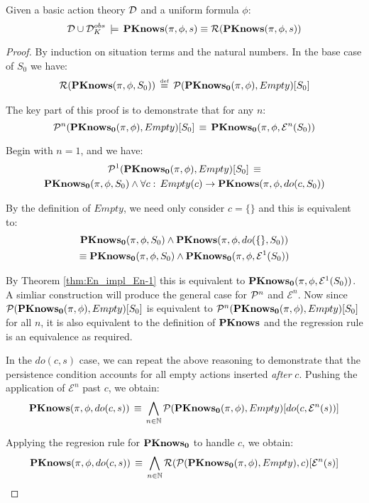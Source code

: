\begin{thmext}
[\ref{thm:Reg_PKnows}] Given a basic action theory $\mathcal{D}$
and a uniform formula $\phi$:\[
\mathcal{D}\cup\mathcal{D}_{K}^{obs}\,\models\,\mathbf{PKnows}(\pi,\phi,s)\equiv\mathcal{R}(\mathbf{PKnows}(\pi,\phi,s))\]

\end{thmext}
\begin{proof}
By induction on situation terms and the natural numbers. In the base
case of $S_{0}$ we have:\begin{gather*}
\mathcal{R}(\mathbf{PKnows}(\pi,\phi,S_{0}))\,\stackrel{\mbox{\tiny def}}{=}\,\mathcal{P}(\mathbf{PKnows_{0}}(\pi,\phi),Empty)[S_{0}]\end{gather*}


The key part of this proof is to demonstrate that for any $n$:\[
\mathcal{P}^{n}(\mathbf{PKnows_{0}}(\pi,\phi),Empty)[S_{0}]\,\equiv\,\mathbf{PKnows_{0}}(\pi,\phi,\mathcal{E}^{n}(S_{0}))\]


Begin with $n=1$, and we have:\begin{multline*}
\mathcal{P}^{1}(\mathbf{PKnows_{0}}(\pi,\phi),Empty)[S_{0}]\,\equiv\\
\mathbf{PKnows_{0}}(\pi,\phi,S_{0})\wedge\forall c:\, Empty(c)\rightarrow\mathbf{PKnows}(\pi,\phi,do(c,S_{0}))\end{multline*}


By the definition of $Empty$, we need only consider $c=\{\}$ and
this is equivalent to:\begin{multline*}
\mathbf{PKnows_{0}}(\pi,\phi,S_{0})\wedge\mathbf{PKnows}(\pi,\phi,do(\{\},S_{0}))\\
\equiv\mathbf{PKnows_{0}}(\pi,\phi,S_{0})\wedge\mathbf{PKnows_{0}}(\pi,\phi,\mathcal{E}^{1}(S_{0}))\end{multline*}


By Theorem \ref{thm:En_impl_En-1} this is equivalent to $\mathbf{PKnows_{0}}(\pi,\phi,\mathcal{E}^{1}(S_{0}))$.
A simliar construction will produce the general case for $\mathcal{P}^{n}$
and $\mathcal{E}^{n}$. Now since $\mathcal{P}(\mathbf{PKnows_{0}}(\pi,\phi),Empty)[S_{0}]$
is equivalent to $\mathcal{P}^{n}(\mathbf{PKnows_{0}}(\pi,\phi),Empty)[S_{0}]$ for
all $n$, it is also equivalent to the definition of $\mathbf{PKnows}$ and
the regression rule is an equivalence as required.

In the $do(c,s)$ case, we can repeat the above reasoning to demonstrate
that the persistence condition accounts for all empty actions inserted
\emph{after }$c$. Pushing the application of $\mathcal{E}^{n}$ past
$c$, we obtain:\[
\mathbf{PKnows}(\pi,\phi,do(c,s))\,\equiv\,\bigwedge_{n\in\mathbb{N}}\mathcal{P}(\mathbf{PKnows_{0}}(\pi,\phi),Empty)[do(c,\mathcal{E}^{n}(s))]\]


Applying the regresion rule for $\mathbf{PKnows_{0}}$ to handle $c$, we obtain:\[
\mathbf{PKnows}(\pi,\phi,do(c,s))\,\equiv\,\bigwedge_{n\in\mathbb{N}}\mathcal{R}(\mathcal{P}(\mathbf{PKnows_{0}}(\pi,\phi),Empty),c)[\mathcal{E}^{n}(s)]\]



\end{proof}
